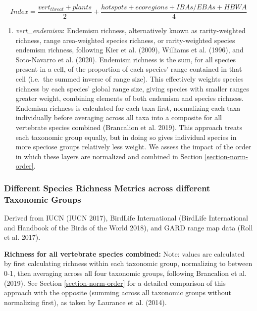 \documentclass[
]{article}
\providecommand{\tightlist}{%
  \setlength{\itemsep}{0pt}\setlength{\parskip}{0pt}}
\begin{document}
\[ Index = \frac{vert_{threat} + plants}{2} + \frac{hotspots + ecoregions + IBAs/EBAs + HBWA}{4} \]

\begin{enumerate}
\def\labelenumi{(\arabic{enumi})}
\setcounter{enumi}{3}
\tightlist
\item
  \emph{vert\_endemism}: Endemism richness, alternatively known as rarity-weighted richness, range area-weighted species richness, or rarity-weighted species endemism richness, following Kier et al. (2009), Williams et al. (1996), and Soto-Navarro et al. (2020). Endemism richness is the sum, for all species present in a cell, of the proportion of each species' range contained in that cell (i.e.~the summed inverse of range size). This effectively weights species richness by each species' global range size, giving species with smaller ranges greater weight, combining elements of both endemism and species richness. Endemism richness is calculated for each taxa first, normalizing each taxa individually before averaging across all taxa into a composite for all vertebrate species combined (Brancalion et al. 2019). This approach treats each taxonomic group equally, but in doing so gives individual species in more speciose groups relatively less weight. We assess the impact of the order in which these layers are normalized and combined in Section \ref{section-norm-order}.
\end{enumerate}

\hypertarget{different-species-richness-metrics-across-different-taxonomic-groups}{%
\subsubsection{Different Species Richness Metrics across different Taxonomic Groups}\label{different-species-richness-metrics-across-different-taxonomic-groups}}

Derived from IUCN (IUCN 2017), BirdLife International (BirdLife International and Handbook of the Birds of the World 2018), and GARD range map data (Roll et al. 2017).

\textbf{Richness for all vertebrate species combined:}
Note: values are calculated by first calculating richness within each taxonomic group, normalizing to between 0-1, then averaging across all four taxonomic groups, following Brancalion et al. (2019). See Section \ref{section-norm-order} for a detailed comparison of this approach with the opposite (summing across all taxonomic groups without normalizing first), as taken by Laurance et al. (2014).
\end{document}
